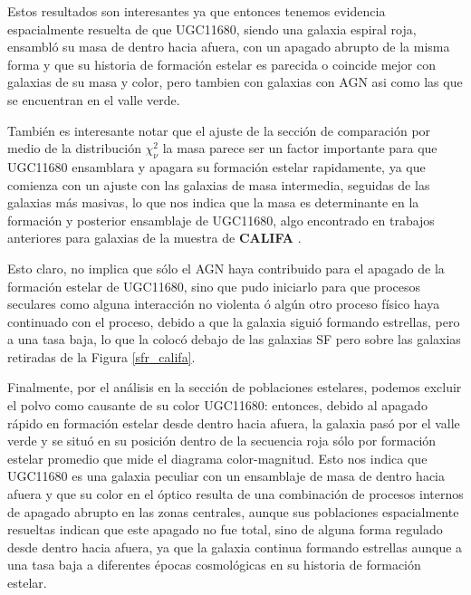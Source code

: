 \bigskip

\noindent Estos resultados son interesantes ya que entonces tenemos evidencia espacialmente resuelta de que UGC11680, siendo una galaxia espiral roja, ensambló su masa de dentro hacia afuera, con un apagado abrupto de la misma forma y que su historia de formación estelar es parecida o coincide mejor con galaxias de su masa y color, pero tambien con galaxias con AGN asi como las que se encuentran en el valle verde. 
\bigskip


\noindent También es interesante notar que el ajuste de la sección de comparación por medio de la distribución $\chi^{2}_{\nu}$ la masa parece ser un factor importante para que UGC11680 ensamblara y apagara su formación estelar rapidamente, ya que comienza con un ajuste con las galaxias de masa intermedia, seguidas de las galaxias más masivas, lo que nos indica que la masa es determinante en la formación y posterior ensamblaje de UGC11680, algo encontrado en trabajos anteriores para galaxias de la muestra de \textbf{CALIFA} \citep{perez2013}. 

\bigskip

\noindent Esto claro, no implica que sólo el AGN haya contribuido para el apagado de la formación estelar de UGC11680, sino que pudo iniciarlo para que procesos seculares como alguna interacción no violenta ó algún otro proceso físico haya continuado con el proceso, debido a que la galaxia siguió formando estrellas, pero a una tasa baja, lo que la colocó debajo de las galaxias SF pero sobre las galaxias retiradas  de la Figura \ref{sfr_califa}. 

\bigskip

\noindent Finalmente, por el análisis en la sección de poblaciones estelares, podemos excluir el polvo como causante de su color UGC11680:  entonces, debido al apagado rápido en formación estelar desde dentro hacia afuera, la galaxia pasó por el valle verde y  se situó en su posición dentro de la secuencia roja sólo por formación estelar promedio que mide el diagrama color-magnitud. Esto nos indica que UGC11680 es una galaxia peculiar con un ensamblaje de masa de dentro hacia afuera y que su color en el óptico resulta de una combinación de procesos internos de apagado abrupto en las zonas centrales, aunque sus poblaciones espacialmente resueltas indican que este apagado no fue total, sino de alguna forma regulado desde dentro hacia afuera, ya que la galaxia continua formando estrellas aunque a  una tasa baja a diferentes épocas cosmológicas en su historia de formación estelar. 




